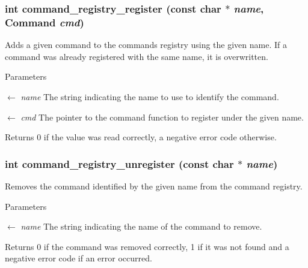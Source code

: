 \subsubsection[{command\_\-registry\_\-register}]{\setlength{\rightskip}{0pt plus 5cm}int command\_\-registry\_\-register (const char $\ast$ {\em name}, \/  {\bf Command} {\em cmd})}\label{dc/d40/commands_2registry_8h_a8c6774df2e791b763852a8adc93630fc}
Adds a given command to the commands registry using the given name. If a command was already registered with the same name, it is overwritten.


\begin{DoxyParams}{Parameters}
\item[\mbox{$\leftarrow$} {\em name}]The string indicating the name to use to identify the command. \item[\mbox{$\leftarrow$} {\em cmd}]The pointer to the command function to register under the given name.\end{DoxyParams}
\begin{DoxyReturn}{Returns}
0 if the value was read correctly, a negative error code otherwise. 
\end{DoxyReturn}
\subsubsection[{command\_\-registry\_\-unregister}]{\setlength{\rightskip}{0pt plus 5cm}int command\_\-registry\_\-unregister (const char $\ast$ {\em name})}\label{dc/d40/commands_2registry_8h_a4c7b6bcad28ffae2335631c8f9fa6c45}
Removes the command identified by the given name from the command registry.


\begin{DoxyParams}{Parameters}
\item[\mbox{$\leftarrow$} {\em name}]The string indicating the name of the command to remove.\end{DoxyParams}
\begin{DoxyReturn}{Returns}
0 if the command was removed correctly, 1 if it was not found and a negative error code if an error occurred. 
\end{DoxyReturn}
